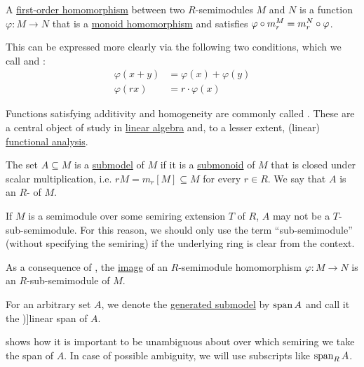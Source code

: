 \begin{definition}
\begin{thmenum}[resume=def:semimodule]
     A \hyperref[def:first_order_homomorphism]{first-order homomorphism} between two \( R \)-semimodules \( M \) and \( N \) is a function \( \varphi: M \to N \) that is a \hyperref[def:monoid/homomorphism]{monoid homomorphism} and satisfies \( \varphi \bincirc m_r^M = m_r^N \bincirc \varphi \).

    This can be expressed more clearly via the following two conditions, which we call  and :
    \begin{align}
      \varphi(x + y) &= \varphi(x) + \varphi(y) \label{eq:def:semimodule/homomorphism/additive} \\
         \varphi(rx) &= r \cdot \varphi(x) \label{eq:def:semimodule/homomorphism/homogeneity}
    \end{align}

    Functions satisfying additivity and homogeneity are commonly called . These are a central object of study in \hyperref[sec:linear_algebra]{linear algebra} and, to a lesser extent, (linear) \hyperref[sec:functional_analysis]{functional analysis}.

     The set \( A \subseteq M \) is a \hyperref[def:first_order_submodel]{submodel} of \( M \) if it is a \hyperref[def:monoid/submodel]{submonoid} of \( M \) that is closed under scalar multiplication, i.e. \( rM = m_r[M] \subseteq M \) for every \( r \in R \). We say that \( A \) is an \( R \)- of \( M \).

    If \( M \) is a semimodule over some semiring extension \( T \) of \( R \), \( A \) may not be a \( T \)-sub-semimodule. For this reason, we should only use the term \enquote{sub-semimodule} (without specifying the semiring) if the underlying ring is clear from the context.

    As a consequence of , the \hyperref[def:set_valued_map/image]{image} of an \( R \)-semimodule homomorphism \( \varphi: M \to N \) is an \( R \)-sub-semimodule of \( M \).

     For an arbitrary set \( A \), we denote the \hyperref[def:first_order_generated_substructure]{generated submodel} by \( \operatorname{span}{ A } \) and call it the \term[ru=линейная оболочка (\cite[sec. 3.2]{Тыртышников2007})]{linear span} of \( A \).

     shows how it is important to be unambiguous about over which semiring we take the span of \( A \). In case of possible ambiguity, we will use subscripts like \( \operatorname{span}_R A \).


\end{thmenum}
\end{definition}
